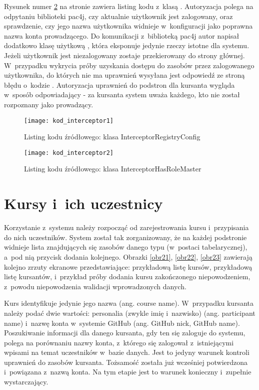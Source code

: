 \medskip
Rysunek numer \ref{kodi2} na stronie \pageref{kodi2} zawiera listing kodu z~klasą . Autoryzacja polega na odpytaniu biblioteki pac4j, czy aktualnie użytkownik jest zalogowany, oraz sprawdzenie, czy jego nazwa użytkownika widnieje w~konfiguracji jako poprawna nazwa konta prowadzącego. Do komunikacji z~biblioteką pac4j autor napisał dodatkowo klasę użytkową , która eksponuje jedynie rzeczy istotne dla systemu. Jeżeli użytkownik jest niezalogowany zostaje przekierowany do strony głównej. W~przypadku wykrycia próby uzyskania dostępu do zasobów przez zalogowanego użytkownika, do których nie ma uprawnień wysyłana jest odpowiedź ze stroną błędu o~kodzie . Autoryzacja uprawnień do podstron dla kursanta wygląda w~sposób odpowiadający - za kursanta system uważa każdego, kto nie został rozpoznany jako prowadzący.

\begin{figure}[!h]
\centering
    \texttt{[image: kod\_interceptor1]}
    \caption{Listing kodu źródłowego: klasa InterceptorRegistryConfig}
    \label{kodi1}
\end{figure}

\begin{figure}[!h]
\centering
    \texttt{[image: kod\_interceptor2]}
    \caption{Listing kodu źródłowego: klasa InterceptorHasRoleMaster}
    \label{kodi2}
\end{figure}

\clearpage
\section{Kursy i~ich uczestnicy}
Korzystanie z~systemu należy rozpocząć od zarejestrowania kursu i~przypisania do nich uczestników. System został tak zorganizowany, że na każdej podstronie widnieje lista znajdujących się zasobów danego typu (w~postaci tabelarycznej), a~pod nią przycisk dodania kolejnego. Obrazki \ref{obr21}, \ref{obr22}, \ref{obr23} zawierają kolejno zrzuty ekranowe przedstawiające: przykładową listę kursów, przykładową listę kursantów, i~przykład próby dodania kursu zakończonego niepowodzeniem, z~powodu niepowodzenia walidacji wprowadzonych danych.

\medskip
Kurs identyfikuje jedynie jego nazwa (ang. course name). W~przypadku kursanta należy podać dwie wartości: personalia (zwykle imię i~nazwisko) (ang. participant name) i~nazwę konta w~systemie GitHub (ang. GitHub nick, GitHub name). Poszukiwanie informacji dla danego kursanta, gdy ten się zaloguje do systemu, polega na porównaniu nazwy konta, z~którego się zalogował z~istniejącymi wpisami na temat uczestników w~bazie danych. Jest to jedyny warunek kontroli uprawnień do zasobów kursanta. Tożsamość została już wcześniej potwierdzona i~powiązana z~nazwą konta. Na tym etapie jest to warunek konieczny i~zupełnie wystarczający.

